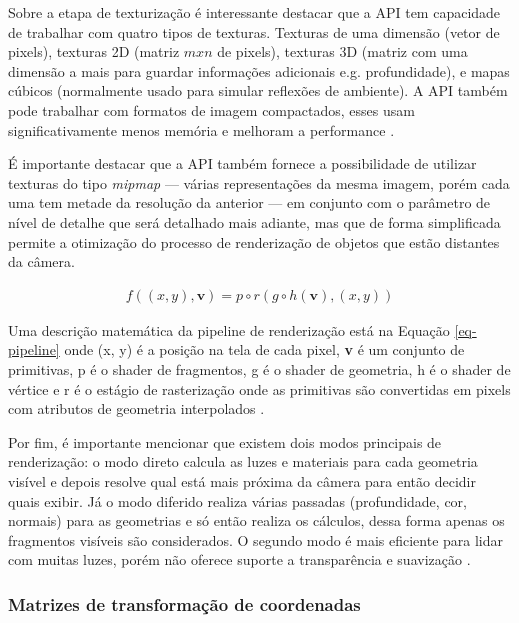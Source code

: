 Sobre a etapa de texturização é interessante destacar que a API tem capacidade de trabalhar com quatro tipos de texturas. Texturas de uma dimensão (vetor de pixels), texturas 2D (matriz $ mxn $ de pixels), texturas 3D (matriz com uma dimensão a mais para guardar informações adicionais e.g. profundidade), e mapas cúbicos (normalmente usado para simular reflexões de ambiente). A API também pode trabalhar com formatos de imagem compactados, esses usam significativamente menos memória e melhoram a performance \cite{GLSLBook}.

É importante destacar que a API também fornece a possibilidade de utilizar texturas do tipo \textit{mipmap} --- várias representações da mesma imagem, porém cada uma tem metade da resolução da anterior --- em conjunto com o parâmetro de nível de detalhe que será detalhado mais adiante, mas que de forma simplificada permite a otimização do processo de renderização de objetos que estão distantes da câmera. 

\begin{equation} \label{eq-pipeline}
	\begin{aligned}
		f((x,y), \mathbf{v})=p \circ r(g \circ h(\mathbf{v}), (x,y)) 
	\end{aligned}
\end{equation}

Uma descrição matemática da pipeline de renderização está na Equação \ref{eq-pipeline} onde (x, y) é a posição na tela de cada pixel, \textbf{v} é um conjunto de primitivas, p é o shader de fragmentos, g é o shader de geometria, h é o shader de vértice e r é o estágio de rasterização onde as primitivas são convertidas em pixels com atributos de geometria interpolados \cite{wang2014auto}.

Por fim, é importante mencionar que existem dois modos principais de renderização: o modo direto calcula as luzes e materiais para cada geometria visível e depois resolve qual está mais próxima da câmera para então decidir quais exibir. Já o modo diferido realiza várias passadas (profundidade, cor, normais) para as geometrias e só então realiza os cálculos, dessa forma apenas os fragmentos visíveis são considerados. O segundo modo é mais eficiente para lidar com muitas luzes, porém não oferece suporte a transparência e suavização \cite{vsmid2017comparison}.

\subsubsection{Matrizes de transformação de coordenadas}
\label{sec:matrizes-transformacao-coordenadas}

